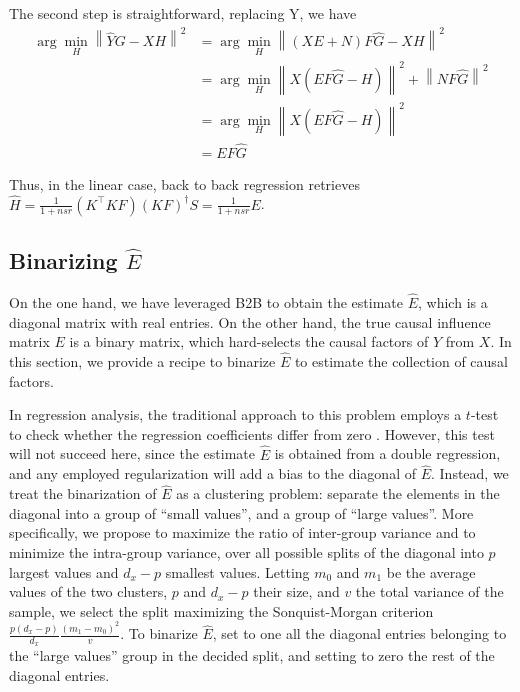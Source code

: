 \documentclass{article}
\begin{document}
The second step is straightforward, replacing Y, we have
\begin{equation}
\begin{aligned}
\arg \min_H \left \| \hat YG - XH \right \|^2 &=\arg  \min_H \left \| (XE + N)F \hat G - XH \right \|^2 \\
&=\arg \min_H \left \| X(EF \hat G - H) \right \| ^2 + \left \| NF\hat G \right \| ^2\\
&= \arg \min_H \left \| X(EF \hat G - H) \right \| ^2\\
&= EF \hat G
\end{aligned}
\end{equation}

Thus, in the linear case, back to back regression retrieves $\hat H = \frac{1}{1+nsr} (K^\top K F)(KF)^{\dagger} S = \frac{1}{1+nsr} E$.



\subsection{Binarizing $\hat{E}$}

On the one hand, we have leveraged B2B to obtain the estimate $\hat{E}$, which is a diagonal matrix with real entries.
%
On the other hand, the true causal influence matrix $E$ is a binary matrix, which hard-selects the causal factors of $Y$ from $X$.
%
In this section, we provide a recipe to binarize $\hat{E}$ to estimate the collection of causal factors.

In regression analysis, the traditional approach to this problem employs a $t$-test to check whether the regression coefficients differ from zero \citep{student1908probable}.
%
However, this test will not succeed here, since the estimate $\hat{E}$ is obtained from a double regression, and any employed regularization will add a bias to the diagonal of $\hat{E}$.
%
Instead, we treat the binarization of $\hat{E}$ as a clustering problem: separate the elements in the diagonal into a group of ``small values'', and a group of ``large values''.
%
More specifically, we propose to maximize the ratio of inter-group variance and to minimize the intra-group variance, over all possible splits of the diagonal into $p$ largest values and $d_x-p$ smallest values.
%
Letting $m_0$ and $m_1$ be the average values of the two clusters, $p$ and $d_x-p$ their size, and $v$ the total variance of the sample, we select the split maximizing the Sonquist-Morgan \citep{sonquist_morgan} criterion $\frac{p(d_x-p)}{d_x} \frac{(m_1 - m_0)^2}{v}$.
%
To binarize $\hat{E}$, set to one all the diagonal entries belonging to the ``large values'' group in the decided split, and setting to zero the rest of the diagonal entries.
\end{document}
